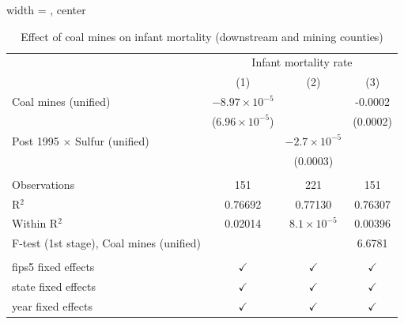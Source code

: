 
\begin{table}[htbp]
   
   \caption{\label{tab:county_imr_dwnstrmcolocate} Effect of coal mines on infant mortality (downstream and mining counties)}
   \bigskip
   
   \centering
   
   \begin{adjustbox}{width = \textwidth, center}
      
      
      \begin{tabular}{lccc}
         \toprule
         
          & \multicolumn{3}{c}{Infant mortality rate}\\
         
                                                  & (1)                     & (2)                   & (3)\\  
         
         \midrule 
         Coal mines (unified)                     & $-8.97\times 10^{-5}$   &                       & -0.0002\\   
                                                  & ($6.96\times 10^{-5}$)  &                       & (0.0002)\\   
         Post 1995 $\times$ Sulfur (unified)      &                         & $-2.7\times 10^{-5}$  &   \\   
                                                  &                         & (0.0003)              &   \\   
         
          \\
         
         Observations                             & 151                     & 221                   & 151\\  
         R$^2$                                    & 0.76692                 & 0.77130               & 0.76307\\  
         Within R$^2$                             & 0.02014                 & $8.1\times 10^{-5}$   & 0.00396\\  
         F-test (1st stage), Coal mines (unified) &                         &                       & 6.6781\\  
         
          \\
         
         fips5 fixed effects                      & $\checkmark$            & $\checkmark$          & $\checkmark$\\   
         state fixed effects                      & $\checkmark$            & $\checkmark$          & $\checkmark$\\   
         year fixed effects                       & $\checkmark$            & $\checkmark$          & $\checkmark$\\   
         

\end{tabular}
\end{adjustbox}
\end{table}

